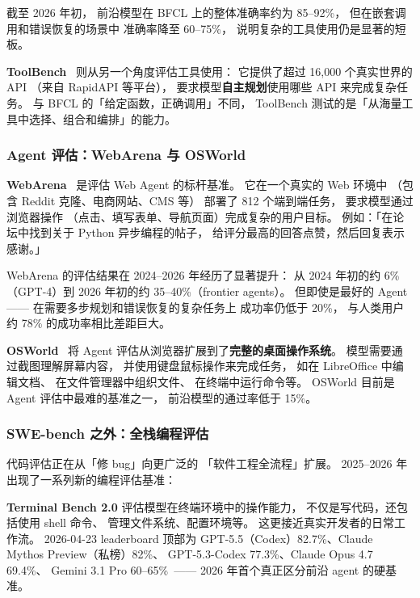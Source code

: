 截至 2026 年初，
前沿模型在 BFCL 上的整体准确率约为 85--92\%，
但在嵌套调用和错误恢复的场景中
准确率降至 60--75\%，
说明复杂的工具使用仍是显著的短板。

\textbf{ToolBench}~\cite{qin2023toolllm}
则从另一个角度评估工具使用：
它提供了超过 16,000 个真实世界的 API
（来自 RapidAPI 等平台），
要求模型\textbf{自主规划}使用哪些 API 来完成复杂任务。
与 BFCL 的「给定函数，正确调用」不同，
ToolBench 测试的是「从海量工具中选择、组合和编排」的能力。

\subsubsection{Agent 评估：WebArena 与 OSWorld}

\textbf{WebArena}~\cite{zhou2024webarena}
是评估 Web Agent 的标杆基准。
它在一个真实的 Web 环境中
（包含 Reddit 克隆、电商网站、CMS 等）
部署了 812 个端到端任务，
要求模型通过浏览器操作
（点击、填写表单、导航页面）完成复杂的用户目标。
例如：「在论坛中找到关于 Python 异步编程的帖子，
给评分最高的回答点赞，然后回复表示感谢。」

WebArena 的评估结果在 2024--2026 年经历了显著提升：
从 2024 年初的约 6\%（GPT-4）到 2026 年初的约 35--40\%（frontier agents）。
但即使是最好的 Agent——
在需要多步规划和错误恢复的复杂任务上
成功率仍低于 20\%，
与人类用户约 78\% 的成功率相比差距巨大。

\textbf{OSWorld}~\cite{xie2024osworld}
将 Agent 评估从浏览器扩展到了\textbf{完整的桌面操作系统}。
模型需要通过截图理解屏幕内容，
并使用键盘鼠标操作来完成任务，
如在 LibreOffice 中编辑文档、
在文件管理器中组织文件、
在终端中运行命令等。
OSWorld 目前是 Agent 评估中最难的基准之一，
前沿模型的通过率低于 15\%。

\subsubsection{SWE-bench 之外：全栈编程评估}

代码评估正在从「修 bug」向更广泛的
「软件工程全流程」扩展。
2025--2026 年出现了一系列新的编程评估基准：

\textbf{Terminal Bench 2.0} 评估模型在终端环境中的操作能力，
不仅是写代码，还包括使用 shell 命令、
管理文件系统、配置环境等。
这更接近真实开发者的日常工作流。
2026-04-23 leaderboard 顶部为
GPT-5.5（Codex）82.7\%、Claude Mythos Preview（私榜）82\%、
GPT-5.3-Codex 77.3\%、Claude Opus 4.7 69.4\%、
Gemini 3.1 Pro 60--65\%~\cite{benchlm2026terminal2,tbench2026leaderboard}——
2026 年首个真正区分前沿 agent 的硬基准。

